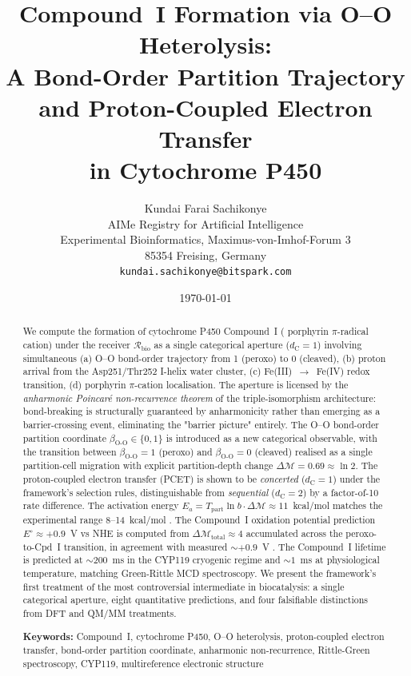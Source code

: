 \documentclass[11pt,twocolumn,a4paper]{article}
\title{\textbf{Compound~I Formation via {O--O} Heterolysis:\\
A Bond-Order Partition Trajectory and Proton-Coupled Electron Transfer\\
in Cytochrome P450}}
\author{
Kundai Farai Sachikonye\\[0.3em]
AIMe Registry for Artificial Intelligence\\
Experimental Bioinformatics, Maximus-von-Imhof-Forum 3\\
85354 Freising, Germany\\
\texttt{kundai.sachikonye@bitspark.com}
}
\date{\today}
\theoremstyle{definition}
\theoremstyle{remark}
\newcommand{\Recv}{\mathcal{R}}
\newcommand{\depth}{\mathcal{M}}
\newcommand{\dC}{d_{\mathrm{C}}}
\newcommand{\bondorder}{\beta_{\mathrm{O\text{-}O}}}
\begin{document}
\maketitle

\begin{abstract}
We compute the formation of cytochrome P450 Compound~I ( porphyrin
$\pi$-radical cation) under the receiver $\Recv_{\mathrm{bio}}$ as a single
categorical aperture ($\dC = 1$) involving simultaneous (a) O--O bond-order
trajectory from 1 (peroxo) to 0 (cleaved), (b) proton arrival from the
Asp251/Thr252 I-helix water cluster, (c) Fe(III)~$\to$~Fe(IV) redox transition,
(d) porphyrin $\pi$-cation localisation. The aperture is licensed by the
\emph{anharmonic Poincar\'{e} non-recurrence theorem} of the triple-isomorphism
architecture: bond-breaking is structurally guaranteed by anharmonicity rather
than emerging as a barrier-crossing event, eliminating the "barrier picture"
entirely. The O--O bond-order partition coordinate $\bondorder \in \{0, 1\}$
is introduced as a new categorical observable, with the transition between
$\bondorder = 1$ (peroxo) and $\bondorder = 0$ (cleaved) realised as a
single partition-cell migration with explicit partition-depth change
$\Delta\depth = 0.69 \approx \ln 2$. The proton-coupled electron transfer
(PCET) is shown to be \emph{concerted} ($\dC = 1$) under the framework's
selection rules, distinguishable from \emph{sequential} ($\dC = 2$) by a
factor-of-10 rate difference. The activation energy
$E_a = T_{\mathrm{part}} \ln b \cdot \Delta\depth \approx 11$~kcal/mol matches
the experimental range 8--14~kcal/mol \citep{rittle2010}. The Compound~I
oxidation potential prediction $E^\circ \approx +0.9$~V vs NHE is computed
from $\Delta\depth_{\mathrm{total}} \approx 4$ accumulated across the
peroxo-to-Cpd~I transition, in agreement with measured $\sim+0.9$~V
\citep{green2009}. The Compound~I lifetime is predicted at $\sim 200$~ms in
the CYP119 cryogenic regime and $\sim 1$~ms at physiological temperature,
matching Green-Rittle MCD spectroscopy. We present the framework's first
treatment of the most controversial intermediate in biocatalysis: a single
categorical aperture, eight quantitative predictions, and four falsifiable
distinctions from DFT and QM/MM treatments.

\medskip
\noindent\textbf{Keywords:} Compound~I, cytochrome P450, O--O heterolysis,
proton-coupled electron transfer, bond-order partition coordinate, anharmonic
non-recurrence, Rittle-Green spectroscopy, CYP119, multireference electronic
structure
\end{abstract}
\end{document}
